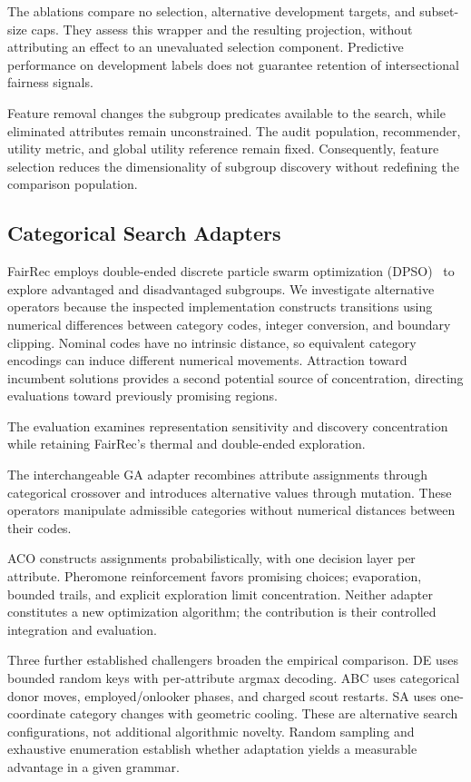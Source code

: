 \documentclass[sigconf,nonacm]{acmart}
\begin{document}
The ablations compare no selection, alternative development targets, and subset-size caps. They assess this wrapper and the resulting projection, without attributing an effect to an unevaluated selection component. Predictive performance on development labels does not guarantee retention of intersectional fairness signals.

Feature removal changes the subgroup predicates available to the search, while eliminated attributes remain unconstrained. The audit population, recommender, utility metric, and global utility reference remain fixed. Consequently, feature selection reduces the dimensionality of subgroup discovery without redefining the comparison population.

\subsection{Categorical Search Adapters}
FairRec employs double-ended discrete particle swarm optimization (DPSO)~\cite{guo2023fairrec} to explore advantaged and disadvantaged subgroups. We investigate alternative operators because the inspected implementation constructs transitions using numerical differences between category codes, integer conversion, and boundary clipping. Nominal codes have no intrinsic distance, so equivalent category encodings can induce different numerical movements. Attraction toward incumbent solutions provides a second potential source of concentration, directing evaluations toward previously promising regions.

The evaluation examines representation sensitivity and discovery concentration while retaining FairRec's thermal and double-ended exploration.

The interchangeable GA adapter recombines attribute assignments through categorical crossover and introduces alternative values through mutation. These operators manipulate admissible categories without numerical distances between their codes.

ACO constructs assignments probabilistically, with one decision layer per attribute. Pheromone reinforcement favors promising choices; evaporation, bounded trails, and explicit exploration limit concentration. Neither adapter constitutes a new optimization algorithm; the contribution is their controlled integration and evaluation.

Three further established challengers broaden the empirical comparison. DE uses bounded random keys with per-attribute argmax decoding. ABC uses categorical donor moves, employed/onlooker phases, and charged scout restarts. SA uses one-coordinate category changes with geometric cooling. These are alternative search configurations, not additional algorithmic novelty. Random sampling and exhaustive enumeration establish whether adaptation yields a measurable advantage in a given grammar.
\end{document}
